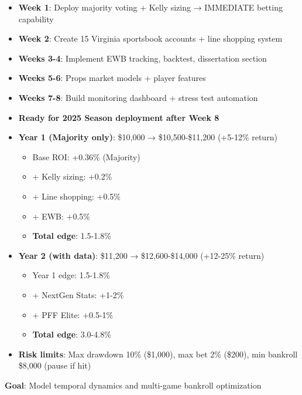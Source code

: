 \begin{itemize}
  \item \textbf{Week 1}: Deploy majority voting + Kelly sizing → IMMEDIATE betting capability
  \item \textbf{Week 2}: Create 15 Virginia sportsbook accounts + line shopping system
  \item \textbf{Weeks 3-4}: Implement EWB tracking, backtest, dissertation section
  \item \textbf{Weeks 5-6}: Props market models + player features
  \item \textbf{Weeks 7-8}: Build monitoring dashboard + stress test automation
  \item \textbf{Ready for 2025 Season deployment after Week 8}
\end{itemize}

\begin{itemize}
  \item \textbf{Year 1 (Majority only)}: \$10,000 → \$10,500-\$11,200 (+5-12\% return)
  \begin{itemize}
    \item Base ROI: +0.36\% (Majority)
    \item + Kelly sizing: +0.2\%
    \item + Line shopping: +0.5\%
    \item + EWB: +0.5\%
    \item \textbf{Total edge}: 1.5-1.8\%
  \end{itemize}
  \item \textbf{Year 2 (with data)}: \$11,200 → \$12,600-\$14,000 (+12-25\% return)
  \begin{itemize}
    \item Year 1 edge: 1.5-1.8\%
    \item + NextGen Stats: +1-2\%
    \item + PFF Elite: +0.5-1\%
    \item \textbf{Total edge}: 3.0-4.8\%
  \end{itemize}
  \item \textbf{Risk limits}: Max drawdown 10\% (\$1,000), max bet 2\% (\$200), min bankroll \$8,000 (pause if hit)
\end{itemize}

\textbf{Goal}: Model temporal dynamics and multi-game bankroll optimization

